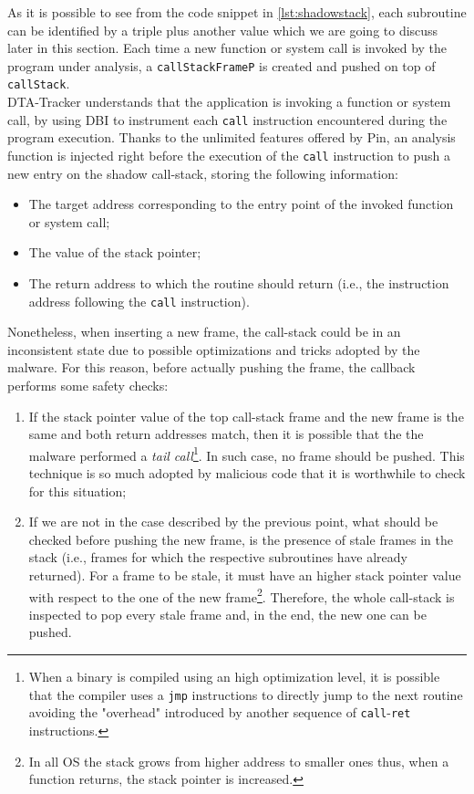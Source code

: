 \documentclass[LaM,binding=0.6cm]{sapthesis}
\begin{document}
As it is possible to see from the code snippet in \ref{lst:shadowstack}, each subroutine can be identified by a triple plus another value which we are going to discuss later in this section. Each time a new function or system call is invoked by the program under analysis, a \texttt{callStackFrameP} is created and pushed on top of \texttt{callStack}.\\
DTA-Tracker understands that the application is invoking a function or system call, by using DBI to instrument each \texttt{call} instruction encountered during the program execution. Thanks to the unlimited features offered by Pin, an analysis function is injected right before the execution of the \texttt{call} instruction to push a new entry on the shadow call-stack, storing the following information:
\begin{itemize}
\item The target address corresponding to the entry point of the invoked function or system call;
\item The value of the stack pointer;
\item The return address to which the routine should return (i.e., the instruction address following the \texttt{call} instruction).
\end{itemize} 
Nonetheless, when inserting a new frame, the call-stack could be in an inconsistent state due to possible optimizations and tricks adopted by the malware. For this reason, before actually pushing the frame, the callback performs some safety checks:
\begin{enumerate}
\item If the stack pointer value of the top call-stack frame and the new frame is the same and both return addresses match, then it is possible that the the malware performed a \textit{tail call}\footnote{When a binary is compiled using an high optimization level, it is possible that the compiler uses a \texttt{jmp} instructions to directly jump to the next routine avoiding the "overhead" introduced by another sequence of \texttt{call}-\texttt{ret} instructions.}. In such case, no frame should be pushed. This technique is so much adopted by malicious code that it is worthwhile to check for this situation;
\item If we are not in the case described by the previous point, what should be checked before pushing the new frame, is the presence of stale frames in the stack (i.e., frames for which the respective subroutines have already returned). For a frame to be stale, it must have an higher stack pointer value with respect to the one of the new frame\footnote{In all OS the stack grows from higher address to smaller ones thus, when a function returns, the stack pointer is increased.}. Therefore, the whole call-stack is inspected to pop every stale frame and, in the end, the new one can be pushed.  
\end{enumerate}
\end{document}
